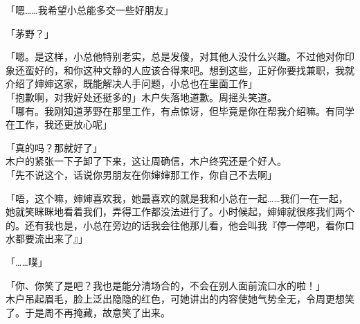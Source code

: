 「嗯……我希望小总能多交一些好朋友」

「茅野？」

「嗯。是这样，小总他特别老实，总是发傻，对其他人没什么兴趣。不过他对你印象还蛮好的，和你这种文静的人应该合得来吧。想到这些，正好你要找兼职，我就介绍了婶婶这家，既能解决人手问题，小总也在里面工作」\\

「抱歉啊，对我好处还挺多的」木户失落地道歉。周摇头笑道。\\

「哪有。我刚知道茅野在那里工作，有点惊讶，但毕竟是你在帮我介绍嘛。有同学在工作，我还更放心呢」

「真的吗？那就好了」\\

木户的紧张一下子卸了下来，这让周确信，木户终究还是个好人。\\

「先不说这个，话说你男朋友在你婶婶那工作，你自己不去啊」

「唔，这个嘛，婶婶喜欢我，她最喜欢的就是我和小总在一起……我们一在一起，她就笑眯眯地看着我们，弄得工作都没法进行了。小时候起，婶婶就很疼我们两个的。还有我也是，小总在旁边的话我会往他那儿看，他会叫我『停一停吧，看你口水都要流出来了』」

「……噗」

「你、你笑了是吧？我也是能分清场合的，不会在别人面前流口水的啦！」\\

木户吊起眉毛，脸上泛出隐隐的红色，可她讲出的内容使她气势全无，令周更想笑了。于是周不再掩藏，故意笑了出来。
